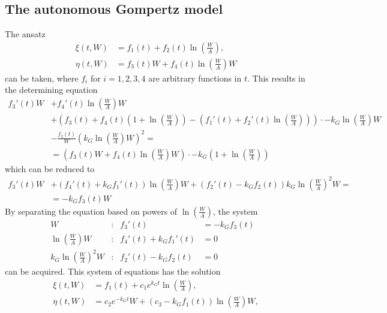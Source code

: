 \subsection{The autonomous Gompertz model}

The ansatz
\begin{align*}
  \xi(t, W) &= f_1(t) + f_2(t) \ln\left(\frac{W}{A}\right),\\
  \eta(t, W) &= f_3(t) W + f_4(t) \ln\left(\frac{W}{A}\right) W
\end{align*}
can be taken, where \(f_i\) for \(i =1,2,3,4\) are arbitrary functions in \(t\).
This results in the determining equation
\begin{align*}
  f_3'(t) W &+ f_4'(t) \ln\left(\frac{W}{A}\right) W \\
  &+ \left( f_3(t) + f_4(t) \left( 1 + \ln\left(\frac{W}{A}\right) \right) - \left( f_1'(t) + f_2'(t) \ln\left(\frac{W}{A}\right) \right) \right) \cdot -k_G \ln\left(\frac{W}{A}\right) W \\
  &- \frac{f_2(t)}{W} \left( k_G \ln\left(\frac{W}{A}\right) W \right)^2 =\\
  &= \left( f_3(t) W + f_4(t) \ln\left(\frac{W}{A}\right) W \right) \cdot -k_G \left( 1 + \ln\left(\frac{W}{A}\right) \right)
\end{align*}
which can be reduced to
\begin{align*}
  f_3'(t) W &+ \left( f_4'(t) + k_G f_1'(t) \right) \ln\left(\frac{W}{A}\right) W + \left( f_2'(t) - k_G f_2(t) \right) k_G \ln\left(\frac{W}{A}\right)^2 W =\\
  &= - k_G f_3(t) W
\end{align*}
By separating the equation based on powers of \(\ln\left(\frac{W}{A}\right)\), the system
\begin{subequations}
  \begin{flalign}
    W & : & f_3'(t) &= -k_G f_3(t) &\label{eq:W}\\
    \ln\left(\frac{W}{A}\right) W & : & f_4'(t) + k_G f_1'(t) &= 0 &\label{eq:WA}\\
    k_G \ln\left(\frac{W}{A}\right)^2 W & : & f_2'(t) - k_G f_2(t) &= 0 &\label{eq:kW2A2W}
  \end{flalign}
\end{subequations}
can be acquired.
This system of equations has the solution
\begin{align*}
  \xi(t, W) &= f_1(t) + c_1 e^{k_G t} \ln\left(\frac{W}{A}\right),\\
  \eta(t, W) &= c_2 e^{-k_G t} W + \left( c_3 - k_G f_1(t) \right) \ln\left(\frac{W}{A}\right) W,
\end{align*}
